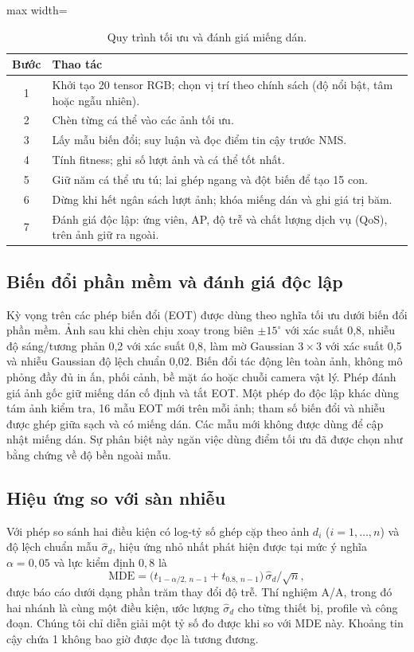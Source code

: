 \documentclass[a4paper,fleqn]{cas-dc}
\begin{document}
\begin{table}[!tp]
\centering\small
\caption{Quy trình tối ưu và đánh giá miếng dán.}
\label{tab:algo}
\begin{adjustbox}{max width=\textwidth}
\begin{tabular}{@{}cp{12.5cm}@{}}
\toprule
Bước & Thao tác \\
\midrule
1 & Khởi tạo 20 tensor RGB; chọn vị trí theo chính sách (độ nổi bật, tâm hoặc ngẫu nhiên). \\
2 & Chèn từng cá thể vào các ảnh tối ưu. \\
3 & Lấy mẫu biến đổi; suy luận và đọc điểm tin cậy trước NMS. \\
4 & Tính fitness; ghi số lượt ảnh và cá thể tốt nhất. \\
5 & Giữ năm cá thể ưu tú; lai ghép ngang và đột biến để tạo 15 con. \\
6 & Dừng khi hết ngân sách lượt ảnh; khóa miếng dán và ghi giá trị băm. \\
7 & Đánh giá độc lập: ứng viên, AP, độ trễ và chất lượng dịch vụ (QoS), trên ảnh giữ ra ngoài. \\
\bottomrule
\end{tabular}
\end{adjustbox}
\end{table}

\subsection{Biến đổi phần mềm và đánh giá độc lập}
Kỳ vọng trên các phép biến đổi (EOT) được dùng theo nghĩa tối ưu dưới biến đổi phần mềm. Ảnh sau khi chèn chịu xoay trong biên $\pm15^{\circ}$ với xác suất 0,8, nhiễu độ sáng/tương phản 0,2 với xác suất 0,8, làm mờ Gaussian $3\times3$ với xác suất 0,5 và nhiễu Gaussian độ lệch chuẩn 0,02. Biến đổi tác động lên toàn ảnh, không mô phỏng đầy đủ in ấn, phối cảnh, bề mặt áo hoặc chuỗi camera vật lý. Phép đánh giá ảnh gốc giữ miếng dán cố định và tắt EOT. Một phép đo độc lập khác dùng tám ảnh kiểm tra, 16 mẫu EOT mới trên mỗi ảnh; tham số biến đổi và nhiễu được ghép giữa sạch và có miếng dán. Các mẫu mới không được dùng để cập nhật miếng dán. Sự phân biệt này ngăn việc dùng điểm tối ưu đã được chọn như bằng chứng về độ bền ngoài mẫu.

\subsection{Hiệu ứng so với sàn nhiễu}
Với phép so sánh hai điều kiện có log-tỷ số ghép cặp theo ảnh $d_i$ ($i=1,\dots,n$) và độ lệch chuẩn mẫu $\hat\sigma_d$, hiệu ứng nhỏ nhất phát hiện được tại mức ý nghĩa $\alpha=0{,}05$ và lực kiểm định $0{,}8$ là
\begin{equation}
\mathrm{MDE}=\bigl(t_{1-\alpha/2,\,n-1}+t_{0.8,\,n-1}\bigr)\,\hat\sigma_d/\sqrt{n},
\end{equation}
được báo cáo dưới dạng phần trăm thay đổi độ trễ. Thí nghiệm A/A, trong đó hai nhánh là cùng một điều kiện, ước lượng $\hat\sigma_d$ cho từng thiết bị, profile và công đoạn. Chúng tôi chỉ diễn giải một tỷ số đo được khi so với MDE này. Khoảng tin cậy chứa 1 không bao giờ được đọc là tương đương.
\end{document}
